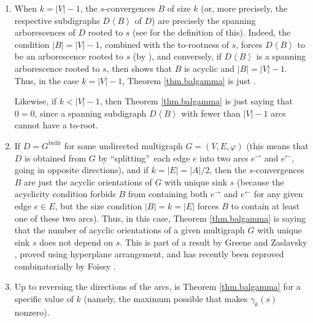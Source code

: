 \documentclass[numbers=enddot,12pt,final,onecolumn,notitlepage]{scrartcl}%
\theoremstyle{definition}
\theoremstyle{plainsl}
\begin{document}
\begin{enumerate}
\item When $k=\left\vert V\right\vert -1$, the $s$-convergences $B$ of size
$k$ (or, more precisely, the respective subdigraphs $D\left\langle
B\right\rangle $ of $D$) are precisely the spanning arborescences of $D$
rooted to $s$ (see \cite[Definition 5.10.1 \textbf{(b)}]{22s} for the
definition of this). Indeed, the condition $\left\vert B\right\vert
=\left\vert V\right\vert -1$, combined with the to-rootness of $s$, forces
$D\left\langle B\right\rangle $ to be an arborescence rooted to $s$ (by
\cite[Theorem 5.10.5]{22s}), and conversely, if $D\left\langle B\right\rangle
$ is a spanning arborescence rooted to $s$, then \cite[Theorem 5.10.5]{22s}
shows that $B$ is acyclic and $\left\vert B\right\vert =\left\vert
V\right\vert -1$. Thus, in the case $k=\left\vert V\right\vert -1$, Theorem
\ref{thm.balgamma} is just \cite[Corollary 5.12.1]{22s}.

Likewise, if $k<\left\vert V\right\vert -1$, then Theorem \ref{thm.balgamma}
is just saying that $0=0$, since a spanning subdigraph $D\left\langle
B\right\rangle $ with fewer than $\left\vert V\right\vert -1$ arcs cannot have
a to-root.

\item If $D=G^{\operatorname*{bidir}}$ for some undirected multigraph
$G=\left(  V,E,\varphi\right)  $ (this means that $D$ is obtained from $G$ by
\textquotedblleft splitting\textquotedblright\ each edge $e$ into two arcs
$e^{\rightarrow}$ and $e^{\leftarrow}$, going in opposite directions), and if
$k=\left\vert E\right\vert =\left\vert A\right\vert /2$, then the
$s$-convergences $B$ are just the acyclic orientations of $G$ with unique sink
$s$ (because the acyclicity condition forbids $B$ from containing both
$e^{\rightarrow}$ and $e^{\leftarrow}$ for any given edge $e\in E$, but the
size condition $\left\vert B\right\vert =k=\left\vert E\right\vert $ forces
$B$ to contain at least one of these two arcs). Thus, in this case, Theorem
\ref{thm.balgamma} is saying that the number of acyclic orientations of a
given multigraph $G$ with unique sink $s$ does not depend on $s$. This is part
of a result by Greene and Zaslavsky \cite[Theorem 7.3]{GreZas83}, proved using
hyperplane arrangement, and has recently been reproved combinatorially by
Foissy \cite[Proposition 4.6]{Foissy22}.

\item Up to reversing the directions of the arcs, \cite[Proposition
3.7]{PerPha15} is Theorem \ref{thm.balgamma} for a specific value of $k$
(namely, the maximum possible that makes $\gamma_{k}\left(  s\right)  $ nonzero).
\end{enumerate}
\end{document}
